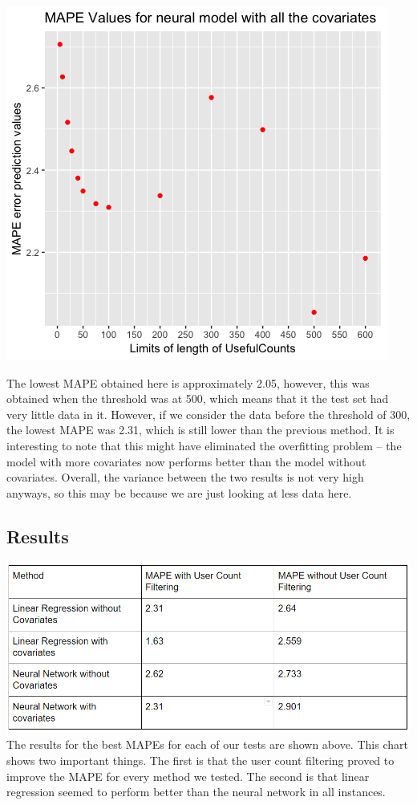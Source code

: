 \documentclass{article}
\begin{document}
\includegraphics[scale = 0.6]{DNC_filter.png}

The lowest MAPE obtained here is approximately 2.05, however, this was obtained when the threshold was at 500, which means that it the test set had very little data in it. However, if we consider the data before the threshold of 300, the lowest MAPE was 2.31, which is still lower than the previous method. It is interesting to note that this might have eliminated the overfitting problem -- the model with more covariates now performs better than the model without covariates. Overall, the variance between the two results is not very high anyways, so this may be because we are just looking at less data here.

\subsection{Results}

\includegraphics[scale = 0.8]{problemBresults.png}
The results for the best MAPEs for each of our tests are shown above. 
This chart shows two important things. The first is that the user count filtering proved to improve the MAPE for every method we tested. The second is that linear regression seemed to perform better than the neural network in all instances.
\end{document}
